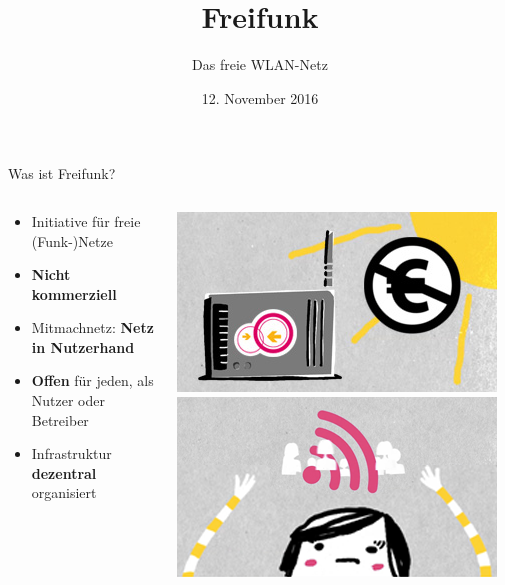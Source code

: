 \documentclass[t]{beamer}
\title{Freifunk}
\author{Das freie WLAN-Netz} %
\date{12. November 2016}
\begin{document}
  \maketitle

  \begin{frame}{Was ist Freifunk?}

    \begin{columns}
      \begin{column}{0.75\textwidth}
        \begin{itemize}
          \item Initiative für freie (Funk-)Netze
          \item \textbf{Nicht kommerziell}
          \item Mitmachnetz: \textbf{Netz in Nutzerhand}
          \item \textbf{Offen} für jeden, als Nutzer oder Betreiber
          \item Infrastruktur \textbf{dezentral} organisiert
        \end{itemize}
      \end{column}
      \begin{column}{0.25\textwidth}
        \begin{center}
          \includegraphics[width=\textwidth]{images/freifunk_insel_nc}\newline
          \includegraphics[width=\textwidth]{images/up}\newline

\end{center}
\end{column}
\end{columns}
\end{frame}
\end{document}
